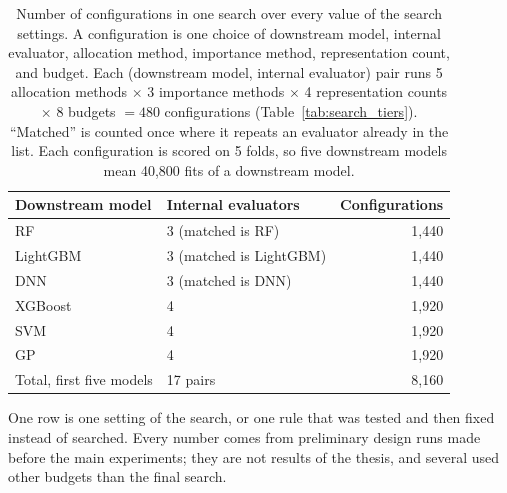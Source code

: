\begin{table}[htbp]
\centering
\small
\caption{Number of configurations in one search over every value of the search settings. A configuration is one choice of downstream model, internal evaluator, allocation method, importance method, representation count, and budget. Each (downstream model, internal evaluator) pair runs 5 allocation methods $\times$ 3 importance methods $\times$ 4 representation counts $\times$ 8 budgets $= 480$ configurations (Table~\ref{tab:search_tiers}). ``Matched'' is counted once where it repeats an evaluator already in the list. Each configuration is scored on 5 folds, so five downstream models mean 40{,}800 fits of a downstream model.}
\label{tab:add:search_size}
\begin{tabular}{@{}llr@{}}
\toprule
Downstream model & Internal evaluators & Configurations \\
\midrule
RF & 3 (matched is RF) & 1{,}440 \\
LightGBM & 3 (matched is LightGBM) & 1{,}440 \\
DNN & 3 (matched is DNN) & 1{,}440 \\
XGBoost & 4 & 1{,}920 \\
SVM & 4 & 1{,}920 \\
GP & 4 & 1{,}920 \\
\midrule
Total, first five models & 17 pairs & 8{,}160 \\
\bottomrule
\end{tabular}
\end{table}

\label{app:add:design_experiments}
One row is one setting of the search, or one rule that was tested and then fixed instead of searched. Every number comes from preliminary design runs made before the main experiments; they are not results of the thesis, and several used other budgets than the final search.

